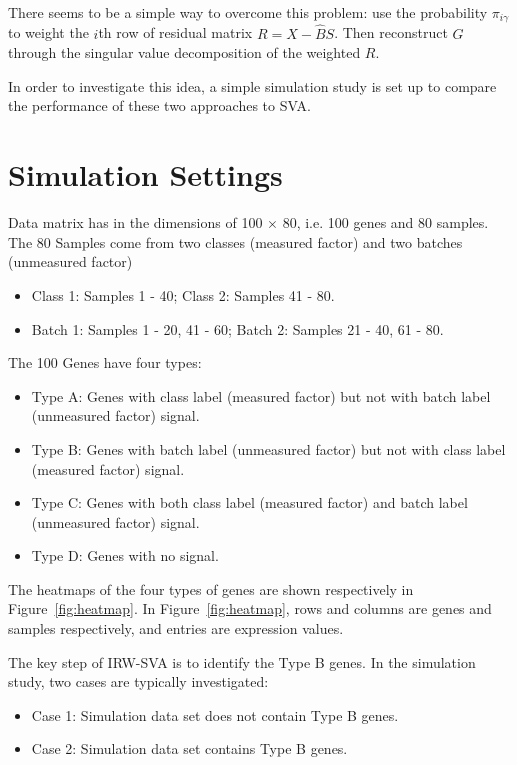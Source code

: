 \documentclass[11pt]{article}
\begin{document}
There seems to be a simple way to overcome this problem: use the probability $\pi_{i \gamma}$ to weight the $i$th row of residual matrix $R = X - \hat{B} S$. Then reconstruct $\hat{G}$ through the singular value decomposition of the weighted $R$. 


In order to investigate this idea, a simple simulation study is set up to compare the performance of these two approaches to SVA.

\section{Simulation Settings} 

Data matrix has in the dimensions of 100 $\times$ 80, i.e. 100 genes and 80 samples.  The 80 Samples come from two classes (measured factor) and two batches (unmeasured factor)
\begin{itemize} 
\item Class 1: Samples 1 - 40; Class 2: Samples 41 - 80.
\item Batch 1: Samples 1 - 20, 41 - 60; Batch 2: Samples 21 - 40, 61 - 80.
\end{itemize}
The 100 Genes have four types:
\begin{itemize}
\item Type A: Genes with class label (measured factor) but not with batch label (unmeasured factor) signal.
\item Type B: Genes with batch label (unmeasured factor) but not with class label (measured factor) signal.
\item Type C: Genes with both class label (measured factor) and batch label (unmeasured factor) signal.
\item Type D: Genes with no signal.
\end{itemize}
The heatmaps of the four types of genes are shown respectively in Figure~\ref{fig:heatmap}. In Figure~\ref{fig:heatmap}, rows and columns are genes and samples respectively, and entries are expression values. 

The key step of IRW-SVA is to identify the Type B genes. In the simulation study, two cases are typically investigated:
\begin{itemize}
\item Case 1: Simulation data set does not contain Type B genes.
\item Case 2: Simulation data set contains Type B genes.
\end{itemize}
\end{document}
